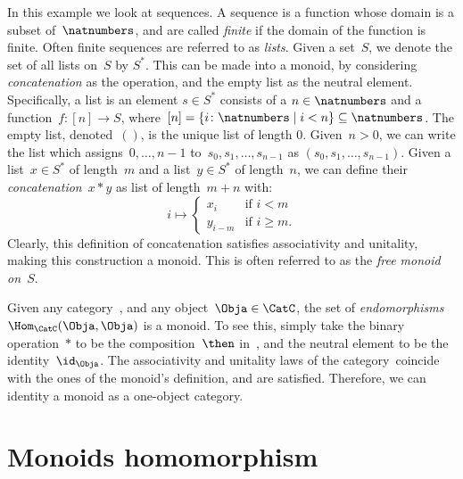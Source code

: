 \begin{example}
  In this example we look at sequences. A sequence is a function whose domain is a subset of~$\natnumbers$, and are called \emph{finite} if the domain of the function is finite. Often finite sequences are referred to as \emph{lists}. Given a set~$S$, we denote the set of all lists on~$S$ by $S^\ast$. This can be made into a monoid, by considering \emph{concatenation} as the operation, and the empty list as the neutral element. Specifically, a list is an element $s\in S^\ast$ consists of a $n\in \natnumbers$ and a function~$f\colon [n]\to S$, where~$[n]=\{i\colon \natnumbers\mid i<n\}\subseteq \natnumbers$. The empty list, denoted~$()$, is the unique list of length 0. Given~$n>0$, we can write the list which assigns~$0,\ldots,n-1$ to~$s_0,s_1,\ldots,s_{n-1}$ as $(s_0,s_1,\ldots,s_{n-1})$. Given a list~$x\in S^\ast$ of length~$m$ and a list~$y\in S^\ast$ of length~$n$, we can define their \emph{concatenation}~$x*y$ as list of length~$m+n$ with:
  \begin{equation*}
    i\mapsto
    \begin{cases}
      x_i&\text{if }i<m\\
      y_{i-m}&\text{if }i\geq m.
    \end{cases}
  \end{equation*}
  Clearly, this definition of concatenation satisfies associativity and unitality, making this construction a monoid. This is often referred to as the \emph{free monoid on~$S$}.
\end{example}

\begin{example}
  Given any category~\CatC, and any object~$\Obja\in \CatC$, the set of \emph{endomorphisms}~$\Hom_{\CatC}(\Obja,\Obja)$ is a monoid. To see this, simply take the binary operation~$\ast$ to be the composition~$\then$ in~\CatC, and the neutral element to be the identity~$\id_\Obja$. The associativity and unitality laws of the category~\CatC coincide with the ones of the monoid's definition, and are satisfied. Therefore, we can identity a monoid as a one-object category.
\end{example}

\section{Monoids homomorphism}


